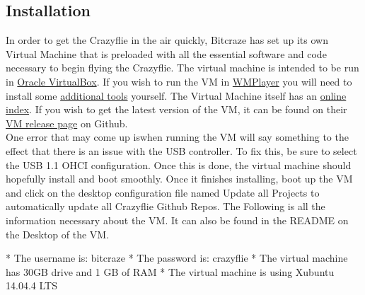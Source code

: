 \documentclass[]{article}
\begin{document}
\subsection{Installation}
\noindent In order to get the Crazyflie in the air quickly, Bitcraze has set up its own Virtual Machine that is preloaded with all the essential software and code necessary to begin flying the Crazyflie. The virtual machine is intended to be run in \href{https://www.virtualbox.org/}{Oracle VirtualBox}. If you wish to run the VM in \href{https://www.vmware.com/products/workstation-player.html}{WMPlayer} you will need to install some \href{https://www.vmware.com/support/ws5/doc/ws_newguest_tools_linux.html#wp1118025}{additional tools} yourself. The Virtual Machine itself has an \href{https://wiki.bitcraze.io/projects:virtualmachine:index}{online index}. If you wish to get the latest version of the VM, it can be found on their \href{https://github.com/bitcraze/bitcraze-vm/releases/}{VM release page} on Github. \\

\noindent One error that may come up iswhen running the VM will say something to the effect that there is an issue with the USB controller. To fix this, be sure to select the USB 1.1 OHCI configuration. Once this is done, the virtual machine should hopefully install and boot smoothly. Once it finishes installing, boot up the VM and click on the desktop configuration file named Update all Projects to automatically update all Crazyflie Github Repos. The Following is all the information necessary about the VM. It can also be found in the README on the Desktop of the VM. \\
\begin{terminal}
* The username is: bitcraze
* The password is: crazyflie
* The virtual machine has 30GB drive and 1 GB of RAM
* The virtual machine is using Xubuntu 14.04.4 LTS
\end{terminal}
\end{document}

